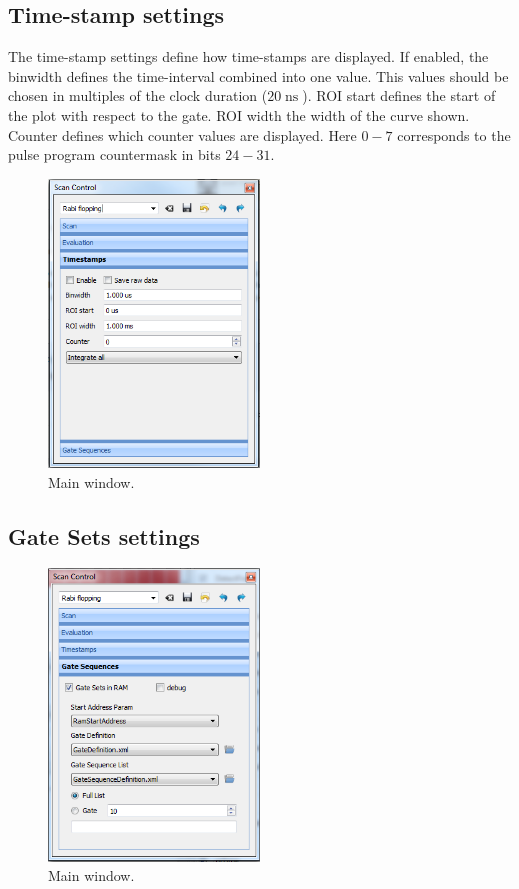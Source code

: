 \documentclass[11pt]{scrartcl}
\newcommand{\unit}[1]{\ensuremath{\operatorname{#1}}}
\begin{document}
\subsection{Time-stamp settings}
The time-stamp settings define how time-stamps are displayed. If enabled, the binwidth defines the time-interval combined into one value. This values should be chosen in multiples of the clock duration ($20\unit{ns}$). ROI start defines the start of the plot with respect to the gate. ROI width the width of the curve shown. Counter defines which counter values are displayed. Here $0-7$ corresponds to the pulse program countermask in bits $24-31$. 
\begin{figure}[htbp]
\begin{center}
\includegraphics[width=0.5\textwidth]{ScanParametersTimestamps}
\end{center}
\caption{\label{PulseProgram} Main window.}
\end{figure}


\subsection{Gate Sets settings}
\begin{figure}[htbp]
\begin{center}
\includegraphics[width=0.5\textwidth]{ScanParametersGateSequences}
\end{center}
\caption{\label{PulseProgram} Main window.}
\end{figure}
\end{document}
